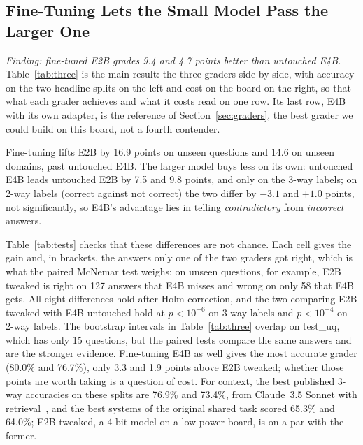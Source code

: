 \documentclass[journal]{IEEEtran}
\begin{document}
\subsection{Fine-Tuning Lets the Small Model Pass the Larger One}
\label{sec:r-acc}
\textit{Finding: fine-tuned E2B grades 9.4 and 4.7 points better than untouched E4B.}
Table~\ref{tab:three} is the main result: the three graders side by side, with accuracy on the two headline splits on the left and cost on the board on the right, so that what each grader achieves and what it costs read on one row.
Its last row, E4B with its own adapter, is the reference of Section~\ref{sec:graders}, the best grader we could build on this board, not a fourth contender.

Fine-tuning lifts E2B by 16.9 points on unseen questions and 14.6 on unseen domains, past untouched E4B.
The larger model buys less on its own: untouched E4B leads untouched E2B by 7.5 and 9.8 points, and only on the 3-way labels; on 2-way labels (correct against not correct) the two differ by $-3.1$ and $+1.0$ points, not significantly, so E4B's advantage lies in telling \textit{contradictory} from \textit{incorrect} answers.

Table~\ref{tab:tests} checks that these differences are not chance.
Each cell gives the gain and, in brackets, the answers only one of the two graders got right, which is what the paired McNemar test weighs: on unseen questions, for example, E2B tweaked is right on 127 answers that E4B misses and wrong on only 58 that E4B gets.
All eight differences hold after Holm correction, and the two comparing E2B tweaked with E4B untouched hold at $p<10^{-6}$ on 3-way labels and $p<10^{-4}$ on 2-way labels.
The bootstrap intervals in Table~\ref{tab:three} overlap on test\_uq, which has only 15 questions, but the paired tests compare the same answers and are the stronger evidence.
Fine-tuning E4B as well gives the most accurate grader (80.0\% and 76.7\%), only 3.3 and 1.9 points above E2B tweaked; whether those points are worth taking is a question of cost.
For context, the best published 3-way accuracies on these splits are 76.9\% and 73.4\%, from Claude~3.5 Sonnet with retrieval~\cite{wang2024rag}, and the best systems of the original shared task scored 65.3\% and 64.0\%; E2B tweaked, a 4-bit model on a low-power board, is on a par with the former.
\end{document}
